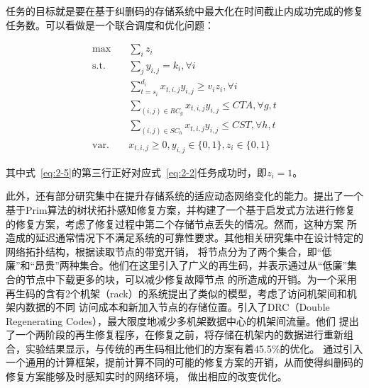 任务的目标就是要在基于纠删码的存储系统中最大化在时间截止内成功完成的修复任务数。可以看做是一个联合调度和优化问题：

\begin{equation}
	\begin{aligned}
		\label{eq:2-5}
		\max \quad        & \sum_{i} z_{i}                                                          \\
		\mbox{s.t.} \quad & \sum_{j} y_{i, j}=k_{i}, \forall i                                      \\
		                  & \sum_{t=s_{i}}^{d_{i}} x_{t, i, j} y_{i, j} \geq v_{i} z_{i}, \forall i \\
		                  & \sum_{(i, j) \in R C_{g}} x_{t, i, j} y_{i, j} \leq C T A, \forall g, t \\
		                  & \sum_{(i, j) \in S C_{h}} x_{t, i, j} y_{i, j} \leq C S T, \forall h, t \\
		\mbox{var.} \quad & x_{t, i, j} \geq 0, y_{i, j} \in\{0,1\}, z_{i} \in\{0,1\}
	\end{aligned}
\end{equation}

其中式~\ref{eq:2-5}的第三行正好对应式~\ref{eq:2-2}任务成功时，即$z_i=1$。


此外，还有部分研究集中在提升存储系统的适应动态网络变化的能力。\citet{li2010tree}提出了一个
基于Prim算法的树状拓扑感知修复方案，并构建了一个基于启发式方法进行修复的修复方案，考虑了修复过程中第二个存储节点丢失的情况。然而，这种方案
所造成的延迟通常情况下不满足系统的可靠性要求。其他相关研究集中在设计特定的网络拓扑结构，\citet{akhlaghi2010fundamental}根据读取节点的带宽开销，
将节点分为了两个集合，即“低廉”和“昂贵”两种集合。他们在这里引入了广义的再生码，并表示通过从“低廉”集合的节点中下载更多的块，可以减少修复故障节点
的所造成的开销。\citet{gaston2013realistic}为一个采用再生码的含有2个机架（rack）的系统提出了类似的模型，考虑了访问机架间和机架内数据的不同
访问成本和新加入节点的存储位置。\citet{hu2016double}引入了DRC（Double Regenerating Codes），最大限度地减少多机架数据中心的机架间流量。他们
提出了一个两阶段的再生修复程序，在修复之前，将存储在机架内的数据进行重新组合，实验结果显示，与传统的再生码相比他们的方案有着45.5\%的优化。
\citet{sipos2018network}通过引入一个通用的计算框架，提前计算不同的可能的修复方案的开销，从而使得纠删码的修复方案能够及时感知实时的网络环境，
做出相应的改变优化。

